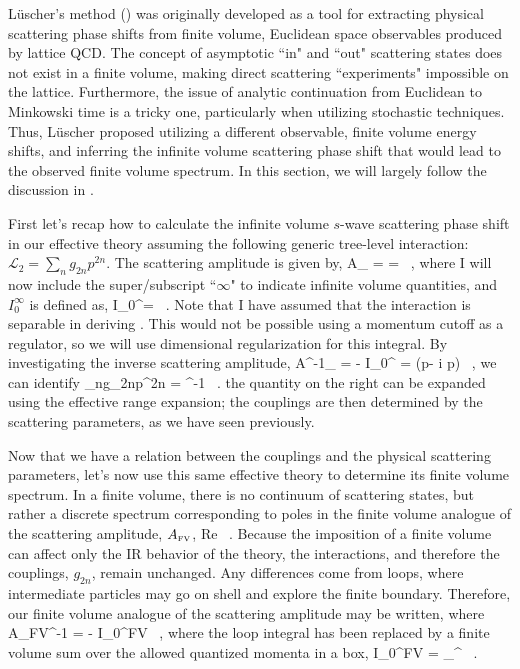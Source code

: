 L\"uscher's method (\cite{Luscher:1986pf,Luscher:1990ux}) was originally developed as a tool for extracting physical scattering phase shifts from finite volume, Euclidean space observables produced by lattice QCD. The concept of asymptotic ``in" and ``out" scattering states does not exist in a finite volume, making direct scattering ``experiments" impossible on the lattice. Furthermore, the issue of analytic continuation from Euclidean to Minkowski time is a tricky one, particularly when utilizing stochastic techniques. Thus, L\"uscher proposed utilizing a different observable, finite volume energy shifts, and inferring the infinite volume scattering phase shift that would lead to the observed finite volume spectrum. In this section, we will largely follow the discussion in \cite{Beane:2003da}.

First let's recap how to calculate the infinite volume $s$-wave scattering phase shift in our effective theory assuming the following generic tree-level interaction: ${\mathcal{ L}}_2 = \sum_n g_{2n}p^{2n}$. The scattering amplitude is given by,
\beq
\label{eq:Aluscher}
A_{\infty} =  =  \ ,
\eeq
where I will now include the super/subscript ``$\infty$" to indicate infinite volume quantities, and $I_0^{\infty}$ is defined as,
\beq
I_0^{\infty}=\int {}  \ .
\eeq
Note that I have assumed that the interaction is separable in deriving . This would not be possible using a momentum cutoff as a regulator, so we will use dimensional regularization for this integral. By investigating the inverse scattering amplitude,
\beq
A^{-1}_{\infty} =  - I_0^{\infty} = (p\cot\delta - i p) \ ,
\eeq 
we can identify
\beq
\label{eq:C2n}
\sum_ng_{2n}p^{2n} = ^{-1} \ .
\eeq
the quantity on the right can be expanded using the effective range expansion; the couplings are then determined by the scattering parameters, as we have seen previously.

Now that we have a relation between the couplings and the physical scattering parameters, let's now use this same effective theory to determine its finite volume spectrum. In a finite volume, there is no continuum of scattering states, but rather a discrete spectrum corresponding to poles in the finite volume analogue of the scattering amplitude, $A_{\mbox{\tiny FV}}$,
\beq
\label{eq:luschereig}
\mbox{Re} \ .
\eeq
Because the imposition of a finite volume can affect only the IR behavior of the theory, the interactions, and therefore the couplings, $g_{2n}$, remain unchanged. Any differences come from loops, where intermediate particles may go on shell and explore the finite boundary. Therefore, our finite volume analogue of the scattering amplitude may be written,
where
\beq
A_{\mbox{\tiny FV}}^{-1} =  - I_0^{\mbox{\tiny FV}} \ ,
\eeq
where the loop integral has been replaced by a finite volume sum over the allowed quantized momenta in a box,
\beq
I_0^{\mbox{\tiny FV}} =  \sum_{}^{\Lambda}  \ .
\eeq


